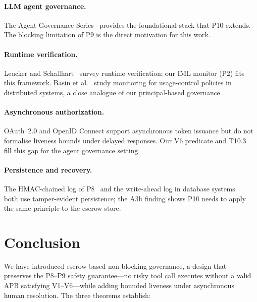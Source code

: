 \documentclass[11pt]{article}
\begin{document}
\paragraph{LLM agent governance.}
The Agent Governance Series~\citep{fernandez2026a,fernandez2026acp,
fernandez2026iml,fernandez2026govstr,fernandez2026ram,fernandez2026opram,
fernandez2026applied,fernandez2026ibg,fernandez2026mcpgov} provides the
foundational stack that P10 extends. The blocking limitation of P9 is
the direct motivation for this work.

\paragraph{Runtime verification.}
Leucker and Schallhart~\citep{leucker2009brief} survey runtime
verification; our IML monitor (P2) fits this framework.
Basin et al.~\citep{basin2012monitoring} study monitoring for
usage-control policies in distributed systems, a close analogue of
our principal-based governance.

\paragraph{Asynchronous authorization.}
OAuth~2.0 and OpenID Connect \citep{hardt2012oauth} support
asynchronous token issuance but do not formalise liveness bounds
under delayed responses. Our V6 predicate and T10.3 fill this gap
for the agent governance setting.

\paragraph{Persistence and recovery.}
The HMAC-chained log of P8~\citep{fernandez2026ibg} and the write-ahead
log in database systems~\citep{mohan1992aries} both use
tamper-evident persistence; the A3b finding shows P10 needs to apply
the same principle to the escrow store.

\section{Conclusion}
\label{sec:conclusion}

We have introduced escrow-based non-blocking governance, a design that
preserves the P8--P9 safety guarantee---no risky tool call executes
without a valid APB satisfying V1--V6---while adding bounded liveness
under asynchronous human resolution. The three theorems establish:
\end{document}
